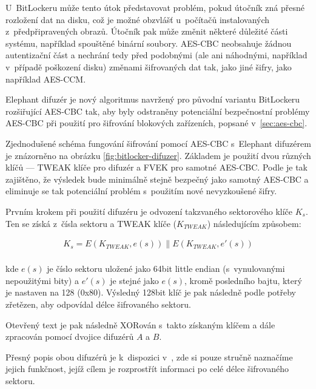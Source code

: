 U~BitLockeru může tento útok představovat problém, pokud útočník zná přesné rozložení dat na disku, což je možné obzvlášť u~počítačů instalovaných z~předpřipravených obrazů. Útočník pak může změnit některé důležité části systému, například spouštěné binární soubory.\cite{Ferguson2006,Rosendorf2013} AES-CBC neobsahuje žádnou autentizační část a nechrání tedy před podobnými (ale ani náhodnými, například v~případě poškození disku) změnami šifrovaných dat tak, jako jiné šifry, jako například AES-CCM.


Elephant difuzér je nový algoritmus navržený pro původní variantu BitLockeru rozšiřující AES-CBC tak, aby byly odstraněny potenciální bezpečnostní problémy AES-CBC při použití pro šifrování blokových zařízeních, popsané v~\ref{sec:aes-cbc}\cite{Ferguson2006}.


Zjednodušené schéma fungování šifrování pomocí AES-CBC s~Elephant difuzérem je znázorněno na obrázku \ref{fig:bitlocker-difuzer}. Základem je použití dvou různých klíčů --- TWEAK klíče pro difuzér a FVEK pro samotné AES-CBC. Podle \cite{Ferguson2006} je tak zajištěno, že výsledek bude minimálně stejně bezpečný jako samotný AES-CBC a eliminuje se tak potenciální problém s~použitím nové nevyzkoušené šifry.

Prvním krokem při použití difuzéru je odvození takzvaného sektorového klíče $K_s$. Ten se získá z~čísla sektoru a TWEAK klíče ($K_{TWEAK}$) následujícím způsobem:

\begin{align}
K_s = E(K_{TWEAK}, e(s)) \parallel E(K_{TWEAK}, e'(s)) \\ \nonumber
\end{align}

kde $e(s)$ je číslo sektoru uložené jako 64bit little endian (s~vynulovanými nepoužitými bity) a $e'(s)$ je stejné jako $e(s)$, kromě posledního bajtu, který je nastaven na 128 (0x80). Výsledný 128bit klíč je pak následně podle potřeby zřetězen, aby odpovídal délce šifrovaného sektoru.\cite{Ferguson2006,Rosendorf2013,Kumar2008}

Otevřený text je pak následně XORován s~takto získaným klíčem a dále zpracován pomocí dvojice difuzérů $A$ a $B$.

Přesný popis obou difuzérů je k~dispozici v~\cite{Ferguson2006}, zde si pouze stručně naznačíme jejich funkčnost, jejíž cílem je rozprostřít informaci po celé délce šifrovaného sektoru.


